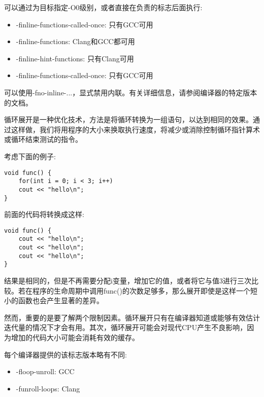 可以通过为目标指定-O0级别，或者直接在负责的标志后面执行:

\begin{itemize}
\item 
-finline-functions-called-once: 只有GCC可用

\item 
-finline-functions: Clang和GCC都可用

\item 
-finline-hint-functions: 只有Clang可用

\item 
-finline-functions-called-once: 只有GCC可用
\end{itemize}

可以使用-fno-inline-...，显式禁用内联。有关详细信息，请参阅编译器的特定版本的文档。


循环展开是一种优化技术，方法是将循环转换为一组语句，以达到相同的效果。通过这样做，我们将用程序的大小来换取执行速度，将减少或消除控制循环指针算术或循环结束测试的指令。

考虑下面的例子:

\begin{lstlisting}[style=styleCXX]
void func() {
	for(int i = 0; i < 3; i++)
	cout << "hello\n";
}
\end{lstlisting}

前面的代码将转换成这样:

\begin{lstlisting}[style=styleCXX]
void func() {
	cout << "hello\n";
	cout << "hello\n";
	cout << "hello\n";
}
\end{lstlisting}

结果是相同的，但是不再需要分配i变量，增加它的值，或者将它与值3进行三次比较。若在程序的生命周期中调用func()的次数足够多，那么展开即使是这样一个短小的函数也会产生显著的差异。

然而，重要的是要了解两个限制因素。循环展开只有在编译器知道或能够有效估计迭代量的情况下才会有用。其次，循环展开可能会对现代CPU产生不良影响，因为增加的代码大小可能会消耗有效的缓存。

每个编译器提供的该标志版本略有不同:

\begin{itemize}
\item 
-floop-unroll: GCC

\item 
-funroll-loops: Clang
\end{itemize}

